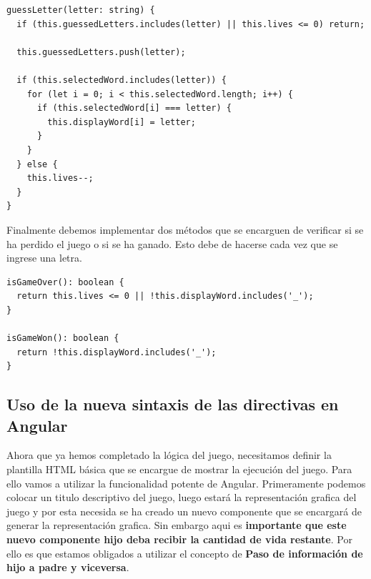 \documentclass[10pt, a4paper]{article}
\begin{document}
\begin{verbatim}
guessLetter(letter: string) {
  if (this.guessedLetters.includes(letter) || this.lives <= 0) return;

  this.guessedLetters.push(letter);

  if (this.selectedWord.includes(letter)) {
    for (let i = 0; i < this.selectedWord.length; i++) {
      if (this.selectedWord[i] === letter) {
        this.displayWord[i] = letter;
      }
    }
  } else {
    this.lives--;
  }
}
\end{verbatim}

Finalmente debemos implementar dos métodos que se encarguen de verificar si se ha perdido el juego o si se ha ganado. Esto debe de hacerse cada vez que se ingrese una letra.

\begin{verbatim}
isGameOver(): boolean {
  return this.lives <= 0 || !this.displayWord.includes('_');
}

isGameWon(): boolean {
  return !this.displayWord.includes('_');
}
\end{verbatim}

\subsection{Uso de la nueva sintaxis de las directivas en Angular}
Ahora que ya hemos completado la lógica del juego, necesitamos definir la plantilla HTML básica que se encargue de mostrar la ejecución del juego.
\singlespacing
Para ello vamos a utilizar la funcionalidad potente de Angular. Primeramente podemos colocar un titulo descriptivo del juego, luego estará la representación grafica del juego y por esta necesida se ha creado un nuevo componente que se encargará de generar la representación grafica. 
\singlespacing
Sin embargo aqui es \textbf{importante que este nuevo componente hijo deba recibir la cantidad de vida restante}. Por ello es que estamos obligados a utilizar el concepto de \textbf{Paso de información de hijo a padre y viceversa}.
\end{document}
